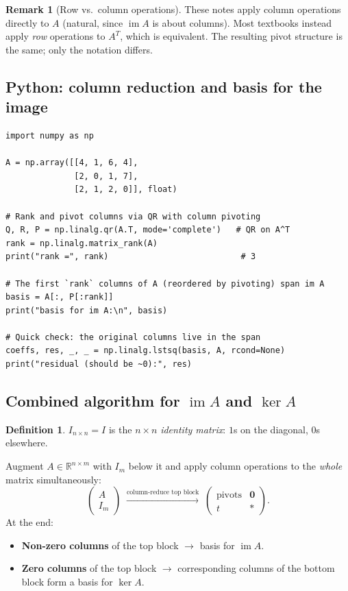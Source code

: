 \documentclass[11pt]{article}
\theoremstyle{definition}
\newtheorem{definition}{Definition}[section]
\newtheorem{remark}{Remark}[section]
\theoremstyle{plain}
\begin{document}
\begin{remark}[Row vs.\ column operations]
  These notes apply column operations directly to $A$ (natural, since
  $\operatorname{im}A$ is about columns).  Most textbooks instead apply
  \emph{row} operations to $A^T$, which is equivalent.  The resulting pivot
  structure is the same; only the notation differs.
\end{remark}

\subsection{Python: column reduction and basis for the image}
\begin{lstlisting}
import numpy as np

A = np.array([[4, 1, 6, 4],
              [2, 0, 1, 7],
              [2, 1, 2, 0]], float)

# Rank and pivot columns via QR with column pivoting
Q, R, P = np.linalg.qr(A.T, mode='complete')   # QR on A^T
rank = np.linalg.matrix_rank(A)
print("rank =", rank)                           # 3

# The first `rank` columns of A (reordered by pivoting) span im A
basis = A[:, P[:rank]]
print("basis for im A:\n", basis)

# Quick check: the original columns live in the span
coeffs, res, _, _ = np.linalg.lstsq(basis, A, rcond=None)
print("residual (should be ~0):", res)
\end{lstlisting}

\subsection{Combined algorithm for $\operatorname{im} A$ and $\ker A$}

\begin{definition}
  $I_{n\times n} = I$ is the $n\times n$ \emph{identity matrix}: $1$s on the
  diagonal, $0$s elsewhere.
\end{definition}

\noindent
Augment $A\in\mathbb{R}^{n\times m}$ with $I_m$ below it and apply column
operations to the \emph{whole} matrix simultaneously:
\[
  \begin{pmatrix}A\\\hline I_m\end{pmatrix}
  \;\xrightarrow{\text{column-reduce top block}}\;
  \begin{pmatrix}\text{pivots} & \mathbf{0}\\\hline t & *\end{pmatrix}.
\]
At the end:
\begin{itemize}
  \item \textbf{Non-zero columns} of the top block $\longrightarrow$
        basis for $\operatorname{im} A$.
  \item \textbf{Zero columns} of the top block $\longrightarrow$
        corresponding columns of the bottom block form a basis for $\ker A$.
\end{itemize}
\end{document}
